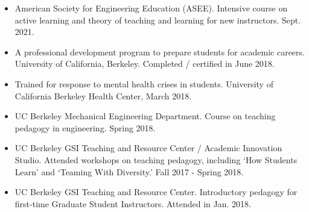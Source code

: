 \documentclass[letterpaper]{deedy-resume} %
\begin{document}
\begin{itemize}

\item {} American Society for Engineering Education (ASEE). Intensive course on active learning and theory of teaching and learning for new instructors. Sept. 2021.

\item {} A professional development program to prepare students for academic careers. University of California, Berkeley. Completed / certified in June 2018.
  
\item {} Trained for response to mental health crises in students. University of California Berkeley Health Center, March 2018.

\item {} UC Berkeley Mechanical Engineering Department. Course on teaching pedagogy in engineering. Spring 2018.
  
\item {} UC Berkeley GSI Teaching and Resource Center / Academic Innovation Studio. Attended workshops on teaching pedagogy, including `How Students Learn' and `Teaming With Diversity.' Fall 2017 - Spring 2018.

\item {} UC Berkeley GSI Teaching and Resource Center. Introductory pedagogy for first-time Graduate Student Instructors. Attended in Jan. 2018.

\end{itemize}


\sectionspace %
\end{document}
